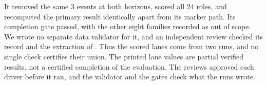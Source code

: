 It removed the same 3 events at both horizons, scored all 24 roles, and recomputed the primary result identically apart from its marker path.
Its completion gate passed, with the other eight families recorded as out of scope.
We wrote no separate data validator for it, and an independent review checked its record and the extraction of .
Thus the scored lanes come from two runs, and no single check certifies their union.
The printed lane values are partial verified results, not a certified completion of the evaluation.
The reviews approved each driver before it ran, and the validator and the gates check what the runs wrote.

